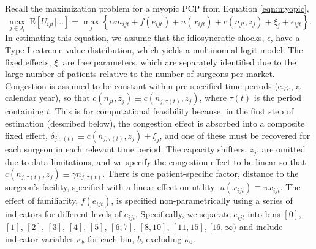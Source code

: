 \documentclass[12pt]{article}
\begin{document}
Recall the maximization problem for a myopic PCP from Equation \eqref{eqn:myopic},
\begin{equation*}
\max_{j \in J_i} \ \text{E} \left[ U_{ijt} | \dots \right]
= \max_j \left\{ \alpha m_{ijt} + f(e_{ijt}) + u(x_{ijt}) + c(n_{jt}, z_j) + \xi_j + \epsilon_{ijt} \right\} .
\end{equation*}
In estimating this equation, we assume that the idiosyncratic shocks, $\epsilon$, have a Type I extreme value distribution, which yields a multinomial logit model. The fixed effects, $\xi$, are free parameters, which are separately identified due to the large number of patients relative to the number of surgeons per market. Congestion is assumed to be constant within pre-specified time periods (e.g., a calendar year), so that $c(n_{jt}, z_j) \equiv c(n_{j, \tau(t)}, z_j)$, where $\tau(t)$ is the period containing $t$. This is for computational feasibility because, in the first step of estimation (described below), the congestion effect is  absorbed into a composite fixed effect, $\delta_{j, \tau(t)} \equiv c(n_{j, \tau(t)}, z_j) + \xi_{j}$, and one of these must be recovered for each surgeon in each relevant time period. The capacity shifters, $z_j$, are omitted due to data limitations, and we specify the congestion effect to be linear so that $c(n_{j, \tau(t)}, z_j) \equiv \gamma n_{j, \tau(t)}$. There is one patient-specific factor, distance to the surgeon's facility, specified with a linear effect on utility: $u(x_{ijt}) \equiv \pi x_{ijt}$. The effect of familiarity, $f(e_{ijt})$, is specified non-parametrically using a series of indicators for different levels of $e_{ijt}$. Specifically, we separate $e_{ijt}$ into bins $[0]$, $[1]$, $[2]$, $[3]$, $[4]$, $[5]$, $[6,7]$, $[8,10]$, $[11,15]$, $[16,\infty)$ and include indicator variables $\kappa_{b}$ for each bin, $b$, excluding $\kappa_{0}$.
\end{document}
